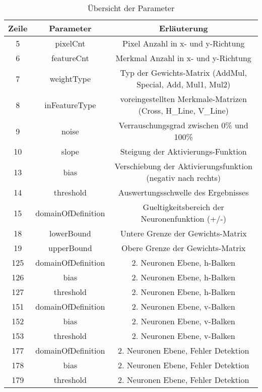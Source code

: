 \begin{table}[hbt]
	\centering
	\begin{tabular}{|c|c|c|}
		
		\hline 
		Zeile & Parameter & Erläuterung \\ 
		\hline 
		5 & pixelCnt & Pixel Anzahl in x- und y-Richtung \\ 
		\hline 
		6 & featureCnt & Merkmal Anzahl in x- und y-Richtung \\ 
		\hline 
		7 & weightType & Typ der Gewichts-Matrix (AddMul, Special, Add, Mul1, Mul2) \\ 
		\hline 
		8 & inFeatureType & voreingestellten Merkmale-Matrizen (Cross, H\_Line, V\_Line) \\ 
		\hline 
		9 & noise & Verrauschungsgrad zwischen 0\% und 100\% \\ 
		\hline 
		10 & slope & Steigung der Aktivierungs-Funktion \\ 
		\hline 
		13 & bias & Verschiebung der Aktivierungsfunktion (negativ nach rechts) \\ 
		\hline 
		14 & threshold & Auswertungsschwelle des Ergebnisses \\ 
		\hline 
		15 & domainOfDefinition & Gueltigkeitsbereich der Neuronenfunktion (+/-) \\ 
		\hline 
		18 & lowerBound & Untere Grenze der Gewichts-Matrix \\ 
		\hline 
		19 & upperBound & Obere Grenze der Gewichts-Matrix \\ 
		\hline 
		125 & domainOfDefinition & 2. Neuronen Ebene, h-Balken \\ 
		\hline
		126 & bias & 2. Neuronen Ebene, h-Balken \\ 
		\hline 
		127 & threshold & 2. Neuronen Ebene, h-Balken \\ 
		\hline 
		151 & domainOfDefinition & 2. Neuronen Ebene, v-Balken \\ 
		\hline
		152 & bias & 2. Neuronen Ebene, v-Balken \\ 
		\hline 
		153 & threshold & 2. Neuronen Ebene, v-Balken \\ 
		\hline 
		177 & domainOfDefinition & 2. Neuronen Ebene, Fehler Detektion \\ 
		\hline
		178 & bias & 2. Neuronen Ebene, Fehler Detektion \\ 
		\hline 
		179 & threshold & 2. Neuronen Ebene, Fehler Detektion \\ 
		\hline 
		
	\end{tabular}
	\caption{Übersicht der Parameter}
	
	\label{ueParameter}
\end{table}
